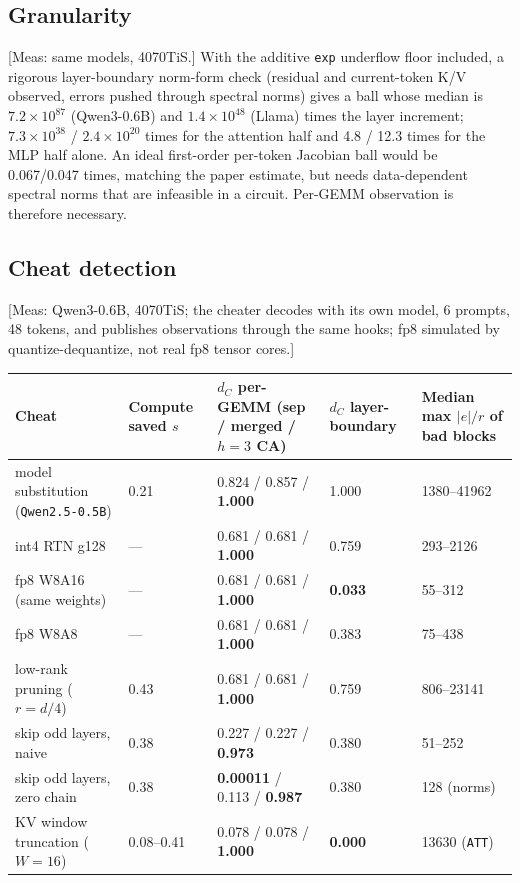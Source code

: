 \documentclass[10pt]{article}
\begin{document}
\subsection{Granularity}
[Meas: same models, 4070TiS.] With the additive \texttt{exp} underflow floor included, a rigorous layer-boundary norm-form check (residual and current-token K/V observed, errors pushed through spectral norms) gives a ball whose median is $7.2\times10^{87}$ (Qwen3-0.6B) and $1.4\times10^{48}$ (Llama) times the layer increment; $7.3\times10^{38}$ / $2.4\times10^{20}$ times for the attention half and 4.8 / 12.3 times for the MLP half alone. An ideal first-order per-token Jacobian ball would be 0.067/0.047 times, matching the paper estimate, but needs data-dependent spectral norms that are infeasible in a circuit. Per-GEMM observation is therefore necessary.

\subsection{Cheat detection}
[Meas: Qwen3-0.6B, 4070TiS; the cheater decodes with its own model, 6 prompts, 48 tokens, and publishes observations through the same hooks; fp8 simulated by quantize-dequantize, not real fp8 tensor cores.]

\begin{center}\small
\begin{tabularx}{\linewidth}{YYYYY}
\toprule
{}\textbf{Cheat} & {}\textbf{Compute saved $s$} & {}\textbf{$d_C$ per-GEMM (sep / merged / $h=3$ CA)} & {}\textbf{$d_C$ layer-boundary} & {}\textbf{Median max $\lvert e\rvert/r$ of bad blocks} \\
\midrule
{}model substitution (\texttt{Qwen2.\allowbreak{}5-0.\allowbreak{}5B}) & {}0.21 & {}0.824 / 0.857 / \textbf{1.000} & {}1.000 & {}1380--41962 \\
{}int4 RTN g128 & {}--- & {}0.681 / 0.681 / \textbf{1.000} & {}0.759 & {}293--2126 \\
{}fp8 W8A16 (same weights) & {}--- & {}0.681 / 0.681 / \textbf{1.000} & {}\textbf{0.033} & {}55--312 \\
{}fp8 W8A8 & {}--- & {}0.681 / 0.681 / \textbf{1.000} & {}0.383 & {}75--438 \\
{}low-rank pruning ($r=d/4$) & {}0.43 & {}0.681 / 0.681 / \textbf{1.000} & {}0.759 & {}806--23141 \\
{}skip odd layers, naive & {}0.38 & {}0.227 / 0.227 / \textbf{0.973} & {}0.380 & {}51--252 \\
{}skip odd layers, zero chain & {}0.38 & {}\textbf{0.00011} / 0.113 / \textbf{0.987} & {}0.380 & {}128 (norms) \\
{}KV window truncation ($W=16$) & {}0.08--0.41 & {}0.078 / 0.078 / \textbf{1.000} & {}\textbf{0.000} & {}13630 (\texttt{ATT}) \\
\bottomrule
\end{tabularx}
\end{center}
\end{document}

